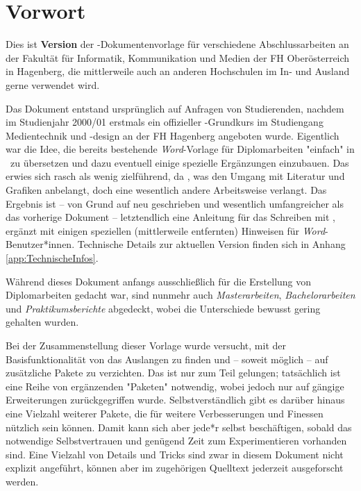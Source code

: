 \chapter{Vorwort} 	%


Dies ist \textbf{Version \hgbDate} der \latex-Dokumentenvorlage für 
verschiedene Abschlussarbeiten an der Fakultät für Informatik, Kommunikation
und Medien der FH Oberösterreich in Hagenberg, die mittlerweile auch 
an anderen Hochschulen im In- und Ausland gerne verwendet wird.

Das Dokument entstand ursprünglich auf Anfragen von Studierenden,
nachdem im Studienjahr 2000/01 erstmals ein offizieller
\latex-Grundkurs im Studiengang Medientechnik und -design an der
FH Hagenberg angeboten wurde. Eigentlich war die Idee, die bereits
bestehende \emph{Word}-Vorlage für Diplomarbeiten "einfach" in
\latex\ zu übersetzen und dazu eventuell einige spezielle
Ergänzungen einzubauen. Das erwies sich rasch als wenig
zielführend, da \latex, \va was den Umgang mit Literatur und
Grafiken anbelangt, doch eine wesentlich andere Arbeitsweise
verlangt. Das Ergebnis ist -- von Grund auf neu geschrieben und
wesentlich umfangreicher als das vorherige Dokument --
letztendlich eine Anleitung für das Schreiben mit \latex, ergänzt
mit einigen speziellen (mittlerweile entfernten) Hinweisen für \emph{Word}-Benutzer*innen.
Technische Details zur aktuellen Version finden sich in Anhang \ref{app:TechnischeInfos}.

Während dieses Dokument anfangs ausschließlich für die Erstellung
von Diplomarbeiten gedacht war, sind nunmehr auch  
\emph{Masterarbeiten}, \emph{Bachelor\-arbeiten} und \emph{Praktikumsberichte} 
abgedeckt, wobei die Unterschiede bewusst gering gehalten wurden.

Bei der Zusammenstellung dieser Vorlage wurde versucht, mit der
Basisfunktionalität von \latex das Auslangen zu finden und -- soweit möglich --
auf zusätzliche Pakete zu verzichten. Das ist nur zum Teil gelungen;
tat\-säch\-lich ist eine Reihe von ergänzenden "Paketen" notwendig, wobei jedoch
nur auf gängige Erweiterungen zurückgegriffen wurde.
Selbstverständlich gibt es darüber hinaus eine Vielzahl weiterer Pakete,
die für weitere Verbesserungen und Finessen nützlich sein können. Damit kann
sich aber jede*r selbst beschäftigen, sobald das notwendige Selbstvertrauen und
genügend Zeit zum Experimentieren vorhanden sind.
Eine Vielzahl von Details und Tricks sind zwar in diesem Dokument nicht explizit
angeführt, können aber im zugehörigen Quelltext jederzeit ausgeforscht
werden.

